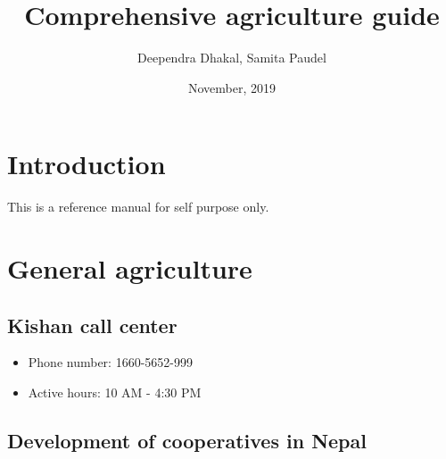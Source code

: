 \documentclass[]{book}
\title{Comprehensive agriculture guide}
\author{Deependra Dhakal, Samita Paudel}
\date{November, 2019}
\providecommand{\tightlist}{%
  \setlength{\itemsep}{0pt}\setlength{\parskip}{0pt}}
\begin{document}
\maketitle

{
\setcounter{tocdepth}{1}
\tableofcontents
}
\hypertarget{introduction}{%
\chapter{Introduction}\label{introduction}}

This is a reference manual for self purpose only.

\hypertarget{general-agriculture}{%
\chapter{General agriculture}\label{general-agriculture}}

\hypertarget{kishan-call-center}{%
\section{Kishan call center}\label{kishan-call-center}}

\begin{itemize}
\tightlist
\item
  Phone number: 1660-5652-999
\item
  Active hours: 10 AM - 4:30 PM
\end{itemize}

\hypertarget{development-of-cooperatives-in-nepal}{%
\section{Development of cooperatives in Nepal}\label{development-of-cooperatives-in-nepal}}
\end{document}
